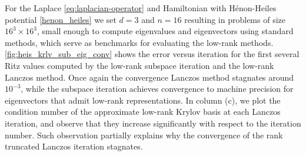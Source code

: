 \documentclass[10pt,preprint]{elsarticle}
\begin{document}
For the Laplace \eqref{eq:laplacian-operator} and Hamiltonian with H\'enon-Heiles potential \eqref{henon_heiles} we set $d=3$ and $n = 16$ resulting in problems of size $16^3 \times 16^3$, small enough to compute eigenvalues and eigenvectors using standard methods, which serve as benchmarks for evaluating the low-rank methods. \cref{fig:heis_krlv_sub_eig_conv} shows the error versus iteration for the first several Ritz values computed by the low-rank subspace iteration and the low-rank Lanczos method. Once again the convergence Lanczos method stagnates around $10^{-3}$, while the subspace iteration achieves convergence to machine precision for eigenvectors that admit low-rank representations. In column (c), we plot the condition number of the approximate low-rank Krylov basis at each Lanczos iteration, and observe that they increase significantly with respect to the iteration number. Such observation partially explains why the convergence of the rank truncated Lanczos iteration stagnates.
\end{document}

